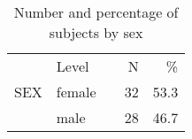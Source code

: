 \begin{table}[ht]
\centering
\caption{Number and percentage of subjects by sex} 
\label{tab:SumCatCov}
\begingroup\footnotesize
\begin{tabular}{llrrr}
  \toprule
   & Level &   & N & \% \\ 
    \cmidrule{2-2} \cmidrule{4-5} 
 SEX & female &  &  32 & 53.3 \\ 
   & male &  &  28 & 46.7 \\ 
   \bottomrule
\end{tabular}
\endgroup
\end{table}

